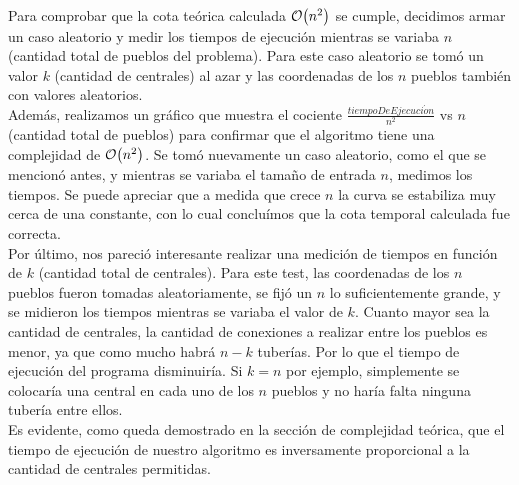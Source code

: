 \documentclass[11pt, a4paper, twoside]{article}
\begin{document}
{}

Para comprobar que la cota teórica calculada $\mathop{}\mathopen{}\mathcal{O}\mathopen{}\left(n^2\right)$ se cumple, decidimos armar un caso aleatorio y 
medir los tiempos de ejecución mientras se variaba $n$ (cantidad total de pueblos del problema). 
Para este caso aleatorio se tomó un valor $k$ (cantidad de centrales) al azar y las coordenadas de los  $n$ 
pueblos también con valores aleatorios. \\
Además, realizamos un gráfico que muestra el cociente $\frac{tiempoDeEjecuci\acute{o}n}{n^2}$ vs $n$ (cantidad
total de pueblos) para confirmar que el algoritmo tiene una complejidad de $\mathop{}\mathopen{}\mathcal{O}\mathopen{}\left(n^2\right)$. 
Se tomó nuevamente un caso aleatorio, como el que se mencionó antes, y mientras se variaba el tamaño de entrada $n$, 
medimos los tiempos. Se puede apreciar que a medida que crece $n$ la curva se estabiliza muy cerca de una constante, 
con lo cual concluímos que la cota temporal calculada fue correcta. \\


Por último, nos pareció interesante realizar una medición de tiempos en función de $k$ (cantidad total de centrales). 
Para este test, las coordenadas de los $n$ pueblos fueron tomadas aleatoriamente, se fijó un $n$ lo 
suficientemente grande, y se midieron los tiempos mientras se variaba el valor de $k$. 
Cuanto mayor sea la cantidad de centrales, la cantidad de conexiones a realizar entre los pueblos es menor, ya que 
como mucho habrá $n - k$ tuberías. Por lo que el tiempo de ejecución del programa disminuiría. 
Si $k = n$ por ejemplo, simplemente se colocaría una central en cada uno de los $n$ pueblos y no haría falta 
ninguna tubería entre ellos.\\
Es evidente, como queda demostrado en la sección de complejidad teórica, que el tiempo de ejecución de nuestro algoritmo es inversamente proporcional a la cantidad de centrales permitidas.
 

   
\end{document}
